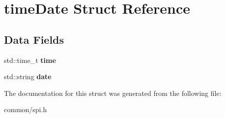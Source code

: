\hypertarget{structtimeDate}{\section{time\-Date Struct Reference}
\label{structtimeDate}
}
\subsection*{Data Fields}
\begin{DoxyCompactItemize}
\item 
\hypertarget{structtimeDate_a4513a3b33d516596a3270a42889d1d77}{std\-::time\-\_\-t {\bfseries time}}\label{structtimeDate_a4513a3b33d516596a3270a42889d1d77}

\item 
\hypertarget{structtimeDate_aba1a6fdf27de686648a1576d29833a9a}{std\-::string {\bfseries date}}\label{structtimeDate_aba1a6fdf27de686648a1576d29833a9a}

\end{DoxyCompactItemize}


The documentation for this struct was generated from the following file\-:\begin{DoxyCompactItemize}
\item 
common/spi.\-h\end{DoxyCompactItemize}
